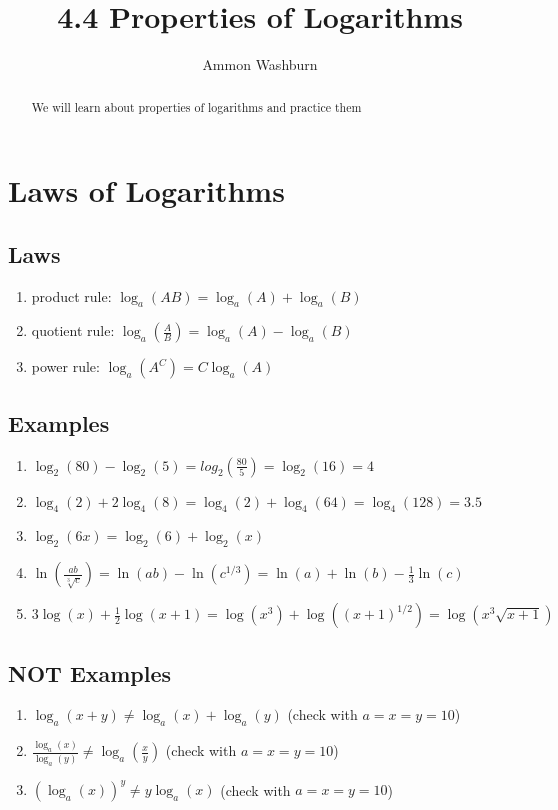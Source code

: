\documentclass{tufte-handout}
\title{4.4 Properties of Logarithms}
\author[AW]{Ammon Washburn}
\begin{document}
\maketitle

\begin{abstract}
We will learn about properties of logarithms and practice them
\end{abstract}

\section{Laws of Logarithms}

\subsection{Laws}
\begin{enumerate}
\item product rule: $\log_a(AB) = \log_a(A) + \log_a(B)$ 
\item quotient rule: $\log_a\left( \frac{A}{B} \right) = \log_a(A) - \log_a(B)$ 
\item power rule: $\log_a(A^C) = C\log_a(A)$
\end{enumerate}

\subsection{Examples}
\begin{enumerate}
\item $\log_2(80) - \log_2(5) = log_2(\frac{80}{5}) = \log_2(16) = 4$
\item $\log_4(2) + 2\log_4(8) = \log_4(2) + \log_4(64) = \log_4(128) = 3.5$
\item $\log_2(6x) = \log_2(6) + \log_2(x)$
\item $\ln\left( \frac{ab}{\sqrt[3]{c}} \right) = \ln(ab) - \ln(c^{1/3}) = \ln(a) + \ln(b) - \frac{1}{3}\ln(c)$
\item $3\log(x) + \frac{1}{2}\log(x+1) = \log(x^3) + \log((x+1)^{1/2}) = \log(x^3\sqrt{x+1})$
\end{enumerate}

\subsection{NOT Examples}
\begin{enumerate}
\item $\log_a(x + y) \not= \log_a(x) + \log_a(y)$ (check with $a = x = y = 10$)
\item $\frac{\log_a(x)}{\log_a(y)} \not= \log_a(\frac{x}{y})$ (check with $a = x = y = 10$)
\item $\left( \log_a(x) \right)^y \not= y \log_a(x)$ (check with $a = x = y = 10$)
\end{enumerate}
\end{document}
